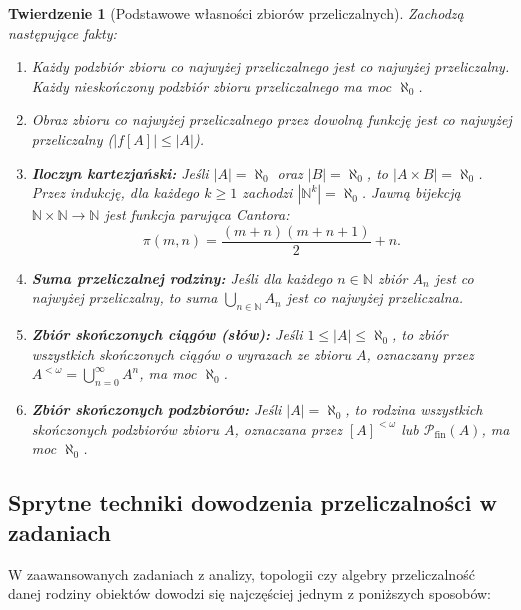 \documentclass[11pt, a4paper]{article}
\theoremstyle{definition}
\theoremstyle{plain}
\newtheorem{twierdzenie}[definicja]{Twierdzenie}
\theoremstyle{remark}
\begin{document}
\begin{twierdzenie}[Podstawowe własności zbiorów przeliczalnych]\label{tw:przeliczalne}
Zachodzą następujące fakty:
\begin{enumerate}
    \item Każdy podzbiór zbioru co najwyżej przeliczalnego jest co najwyżej przeliczalny. Każdy nieskończony podzbiór zbioru przeliczalnego ma moc $\aleph_0$.
    \item Obraz zbioru co najwyżej przeliczalnego przez dowolną funkcję jest co najwyżej przeliczalny ($|f[A]| \le |A|$).
    \item \textbf{Iloczyn kartezjański:} Jeśli $|A| = \aleph_0$ oraz $|B| = \aleph_0$, to $|A \times B| = \aleph_0$. Przez indukcję, dla każdego $k \ge 1$ zachodzi $|\mathbb{N}^k| = \aleph_0$. Jawną bijekcją $\mathbb{N} \times \mathbb{N} \to \mathbb{N}$ jest funkcja parująca Cantora:
    \[
        \pi(m, n) = \frac{(m + n)(m + n + 1)}{2} + n.
    \]
    \item \textbf{Suma przeliczalnej rodziny:} Jeśli dla każdego $n \in \mathbb{N}$ zbiór $A_n$ jest co najwyżej przeliczalny, to suma $\bigcup_{n \in \mathbb{N}} A_n$ jest co najwyżej przeliczalna.
    \item \textbf{Zbiór skończonych ciągów (słów):} Jeśli $1 \le |A| \le \aleph_0$, to zbiór wszystkich skończonych ciągów o wyrazach ze zbioru $A$, oznaczany przez $A^{<\omega} = \bigcup_{n=0}^{\infty} A^n$, ma moc $\aleph_0$.
    \item \textbf{Zbiór skończonych podzbiorów:} Jeśli $|A| = \aleph_0$, to rodzina wszystkich skończonych podzbiorów zbioru $A$, oznaczana przez $[A]^{<\omega}$ lub $\mathcal{P}_{\mathrm{fin}}(A)$, ma moc $\aleph_0$.
\end{enumerate}
\end{twierdzenie}

\subsection{Sprytne techniki dowodzenia przeliczalności w zadaniach}

W zaawansowanych zadaniach z analizy, topologii czy algebry przeliczalność danej rodziny obiektów dowodzi się najczęściej jednym z poniższych sposobów:
\end{document}
